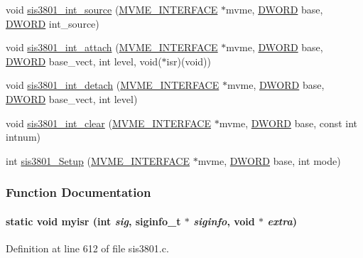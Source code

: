 \begin{DoxyCompactItemize}
\item 
void \hyperlink{sis3801_8c_aebbdd78e2820274c740be5cb75546086}{sis3801\_\-int\_\-source} (\hyperlink{structMVME__INTERFACE}{MVME\_\-INTERFACE} $\ast$mvme, \hyperlink{vt2_8h_a798af1e30bc65f319c1a246cecf59e39}{DWORD} base, \hyperlink{vt2_8h_a798af1e30bc65f319c1a246cecf59e39}{DWORD} int\_\-source)
\item 
void \hyperlink{sis3801_8c_a7f43596a68de1d6fa6abe790cc58ca70}{sis3801\_\-int\_\-attach} (\hyperlink{structMVME__INTERFACE}{MVME\_\-INTERFACE} $\ast$mvme, \hyperlink{vt2_8h_a798af1e30bc65f319c1a246cecf59e39}{DWORD} base, \hyperlink{vt2_8h_a798af1e30bc65f319c1a246cecf59e39}{DWORD} base\_\-vect, int level, void($\ast$isr)(void))
\item 
void \hyperlink{sis3801_8c_afba204e4b4b5d65ed9ad844f61cd6e5f}{sis3801\_\-int\_\-detach} (\hyperlink{structMVME__INTERFACE}{MVME\_\-INTERFACE} $\ast$mvme, \hyperlink{vt2_8h_a798af1e30bc65f319c1a246cecf59e39}{DWORD} base, \hyperlink{vt2_8h_a798af1e30bc65f319c1a246cecf59e39}{DWORD} base\_\-vect, int level)
\item 
void \hyperlink{sis3801_8c_a9b524fa0921f6b80326dc3f94307e8be}{sis3801\_\-int\_\-clear} (\hyperlink{structMVME__INTERFACE}{MVME\_\-INTERFACE} $\ast$mvme, \hyperlink{vt2_8h_a798af1e30bc65f319c1a246cecf59e39}{DWORD} base, const int intnum)
\item 
int \hyperlink{sis3801_8c_a7d52fd729b9104f9fedce663a0ac0ca1}{sis3801\_\-Setup} (\hyperlink{structMVME__INTERFACE}{MVME\_\-INTERFACE} $\ast$mvme, \hyperlink{vt2_8h_a798af1e30bc65f319c1a246cecf59e39}{DWORD} base, int mode)
\end{DoxyCompactItemize}


\subsubsection{Function Documentation}
\paragraph[{myisr}]{\setlength{\rightskip}{0pt plus 5cm}static void myisr (int {\em sig}, \/  siginfo\_\-t $\ast$ {\em siginfo}, \/  void $\ast$ {\em extra})}\hfill\label{sis3801_8c_aa61dddebb9f7a39b96e8f03e710e878f}


Definition at line 612 of file sis3801.c.
